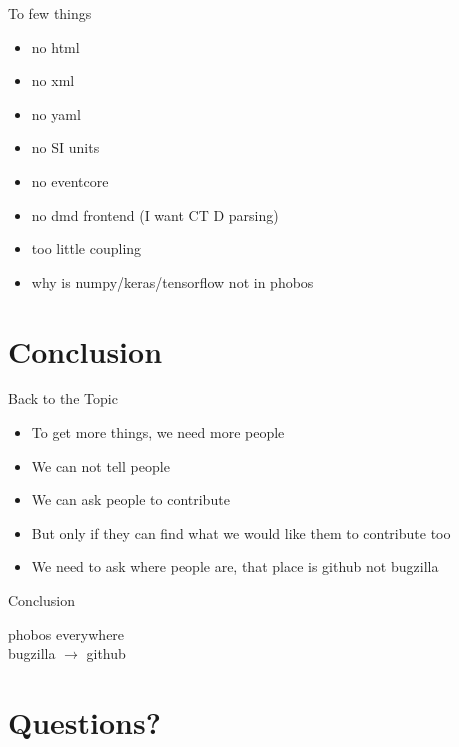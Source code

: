 \documentclass[aspectratio=169,notes]{beamer}
\begin{document}
	\begin{frame}[fragile]{To few things}
		\begin{itemize}
			\item no html
			\item no xml
			\item no yaml
			\item no SI units
			\item no eventcore
			\item no dmd frontend (I want CT D parsing)
			\item too little coupling
			\item why is numpy/keras/tensorflow not in phobos
		\end{itemize}
	\end{frame}

	\section{Conclusion}
	\begin{frame}[fragile]{Back to the Topic}
		\begin{itemize}
			\item To get more things, we need more people
			\item We can not tell people\\[1cm]
			\pause
			\item {\Huge We can ask people to contribute}\\[1cm]
			\item But only if they can find what we would like them to contribute too
			\item We need to ask where people are, that place is github not bugzilla
		\end{itemize}
	\end{frame}
	\begin{frame}[fragile]{Conclusion}
		\Huge
		\begin{center}
		phobos everywhere\\[1cm]
		bugzilla $\rightarrow$ github\\[1cm]
		\end{center}
	\end{frame}
	\section{Questions?}
\end{document}
